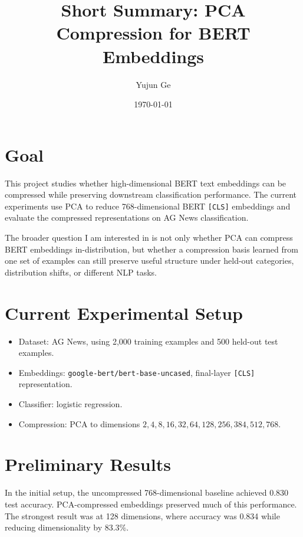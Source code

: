 \documentclass[11pt]{article}
\title{Short Summary: PCA Compression for BERT Embeddings}
\author{Yujun Ge}
\date{\today}
\begin{document}
\maketitle

\section{Goal}

This project studies whether high-dimensional BERT text embeddings can be compressed while preserving downstream classification performance. The current experiments use PCA to reduce 768-dimensional BERT \texttt{[CLS]} embeddings and evaluate the compressed representations on AG News classification.

The broader question I am interested in is not only whether PCA can compress BERT embeddings in-distribution, but whether a compression basis learned from one set of examples can still preserve useful structure under held-out categories, distribution shifts, or different NLP tasks.

\section{Current Experimental Setup}

\begin{itemize}
    \item Dataset: AG News, using 2,000 training examples and 500 held-out test examples.
    \item Embeddings: \texttt{google-bert/bert-base-uncased}, final-layer \texttt{[CLS]} representation.
    \item Classifier: logistic regression.
    \item Compression: PCA to dimensions $2,4,8,16,32,64,128,256,384,512,768$.
\end{itemize}

\section{Preliminary Results}

In the initial setup, the uncompressed 768-dimensional baseline achieved 0.830 test accuracy. PCA-compressed embeddings preserved much of this performance. The strongest result was at 128 dimensions, where accuracy was 0.834 while reducing dimensionality by 83.3\%.
\end{document}
